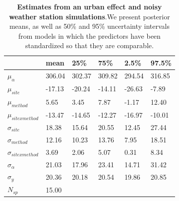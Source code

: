 \documentclass{article}\usepackage[]{graphicx}\usepackage[]{color}
\begin{document}
\begin{table}[ht]
\centering
\caption{\textbf{Estimates from an urban effect and noisy weather station simulations}.We present posterior means, as well as 50\% and 95\% uncertainty intervals from models in which the predictors have been standardized so that they are comparable.} 
\label{tab:urbmethod}
\begingroup\footnotesize
\begin{tabular}{|p{}|p{}p{}p{}p{}p{}|}
  \hline
 & mean & 25\% & 75\% & 2.5\% & 97.5\% \\ 
  \hline
$\mu_{\alpha}$ & 306.04 & 302.37 & 309.82 & 294.54 & 316.85 \\ 
  $\mu_{site}$ & -17.13 & -20.24 & -14.11 & -26.63 & -7.89 \\ 
  $\mu_{method}$ & 5.65 & 3.45 & 7.87 & -1.17 & 12.40 \\ 
  $\mu_{sitexmethod}$ & -13.47 & -14.65 & -12.27 & -16.97 & -10.01 \\ 
  $\sigma_{site}$ & 18.38 & 15.64 & 20.55 & 12.45 & 27.44 \\ 
  $\sigma_{method}$ & 12.16 & 10.23 & 13.76 & 7.95 & 18.51 \\ 
  $\sigma_{sitexmethod}$ & 3.69 & 2.06 & 5.07 & 0.31 & 8.34 \\ 
  $\sigma_{\alpha}$ & 21.03 & 17.96 & 23.41 & 14.71 & 31.42 \\ 
  $\sigma_{y}$ & 20.36 & 20.18 & 20.54 & 19.86 & 20.85 \\ 
   \hline
$N_{sp}$ & 15.00 &  &  &  &  \\ 
   \hline
\end{tabular}
\endgroup
\end{table}
\end{document}
